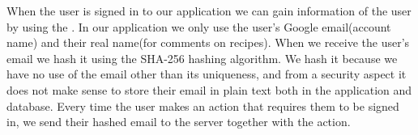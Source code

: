 When the user is signed in to our application we can gain information of the user by using the .
In our application we only use the user's Google email(account name) and their real name(for comments on recipes). 
When we receive the user's email we hash it using the SHA-256 hashing algorithm. We hash it because we have no use of the email other than its uniqueness, and from a security aspect it does not make sense to store their email in plain text both in the application and database. 
Every time the user makes an action that requires them to be signed in, we send their hashed email to the server together with the action. 



